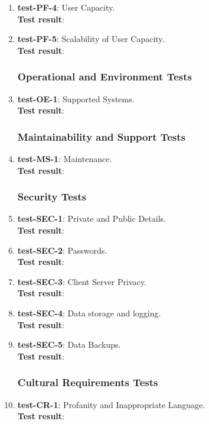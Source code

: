 \documentclass[12pt, titlepage]{article}
\begin{document}
\begin{enumerate}
	\item{\textbf{test-PF-4}}: User Capacity.\\
	\textbf{Test result}:
	
	\item{\textbf{test-PF-5}}: Scalability of User Capacity.\\
	\textbf{Test result}:
	
\subsubsection{Operational and Environment Tests}
	\item{\textbf{test-OE-1}}: Supported Systems.\\
	\textbf{Test result}:
	
\subsubsection{Maintainability and Support Tests}
	\item{\textbf{test-MS-1}}: Maintenance.\\
	\textbf{Test result}:
	
\subsubsection{Security Tests}
	\item{\textbf{test-SEC-1}}: Private and Public Details.\\
	\textbf{Test result}:
	
	\item{\textbf{test-SEC-2}}: Passwords.\\
	\textbf{Test result}:
	
	\item{\textbf{test-SEC-3}}: Client Server Privacy.\\
	\textbf{Test result}:
	
	\item{\textbf{test-SEC-4}}: Data storage and logging.\\
	\textbf{Test result}:
	
	\item{\textbf{test-SEC-5}}: Data Backups.\\
	\textbf{Test result}:
	
\subsubsection{Cultural Requirements Tests}
	\item{\textbf{test-CR-1}}: Profanity and Inappropriate Language.\\
	\textbf{Test result}:
	

\end{enumerate}
\end{document}
